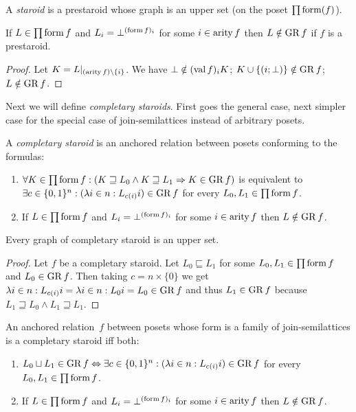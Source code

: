 \begin{defn}
A \emph{staroid} is a prestaroid whose graph is an
upper set (on the poset $\prod\operatorname{form}(f)$).\end{defn}
\begin{prop}
If $L\in\prod\operatorname{form} f$ and $L_{i}=\bot^{(\operatorname{form} f)_{i}}$ for some
$i\in\operatorname{arity} f$ then $L\notin\operatorname{GR} f$ if $f$ is a prestaroid.\end{prop}
\begin{proof}
Let $K=L|_{(\operatorname{arity} f)\setminus\{i\}}$. We have $\bot\notin(\operatorname{val} f)_{i}K$;
$K\cup\{(i;\bot)\}\notin\operatorname{GR} f$; $L\notin\operatorname{GR} f$.
\end{proof}
Next we will define \emph{completary staroids}. First goes the general
case, next simpler case for the special case of join-semilattices
instead of arbitrary posets.
\begin{defn}
A \emph{completary staroid} is an anchored
relation between posets conforming to the formulas:
\begin{enumerate}
\item $\forall K\in\prod\operatorname{form} f:(K\sqsupseteq L_{0}\wedge K\sqsupseteq L_{1}\Rightarrow K\in\operatorname{GR} f)$
is equivalent to $\exists c\in\{0,1\}^{n}:(\lambda i\in n:L_{c(i)}i)\in\operatorname{GR} f$
for every $L_{0},L_{1}\in\prod\operatorname{form} f$.
\item If $L\in\prod\operatorname{form} f$ and $L_{i}=\bot^{(\operatorname{form} f)_{i}}$ for some
$i\in\operatorname{arity} f$ then $L\notin\operatorname{GR} f$.
\end{enumerate}
\end{defn}
\begin{lem}
Every graph of completary staroid is an upper set.\end{lem}
\begin{proof}
Let $f$ be a completary staroid. Let $L_{0}\sqsubseteq L_{1}$ for
some $L_{0},L_{1}\in\prod\operatorname{form} f$ and $L_{0}\in\operatorname{GR} f$. Then taking
$c=n\times\{0\}$ we get $\lambda i\in n:L_{c(i)}i=\lambda i\in n:L_{0}i=L_{0}\in\operatorname{GR} f$
and thus $L_{1}\in\operatorname{GR} f$ because $L_{1}\sqsupseteq L_{0}\wedge L_{1}\sqsupseteq L_{1}$.\end{proof}
\begin{prop}
An anchored relation~$f$ between posets whose form is
a family of join-semilattices is a completary staroid iff both:
\begin{enumerate}
\item \label{cary-main}$L_{0}\sqcup L_{1}\in\operatorname{GR} f\Leftrightarrow\exists c\in\{0,1\}^{n}:(\lambda i\in n:L_{c(i)}i)\in\operatorname{GR} f$
for every $L_{0},L_{1}\in\prod\operatorname{form} f$.
\item \label{cary-zero}If $L\in\prod\operatorname{form} f$ and $L_{i}=\bot^{(\operatorname{form} f)_{i}}$
for some $i\in\operatorname{arity} f$ then $L\notin\operatorname{GR} f$.
\end{enumerate}
\end{prop}

